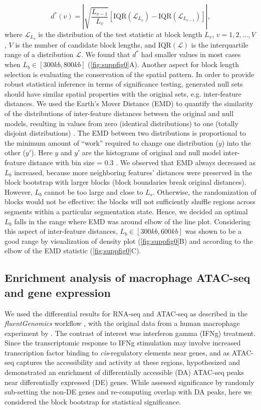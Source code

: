 \documentclass{article}
\begin{document}
$$ d^*(v)= \left| \sqrt{\frac{L_{v-1}}{L_v}} [\text{IQR}(\mathcal{L}_{L_v})-\text{IQR}(\mathcal{L}_{L_{v-1}})] \right|,$$
where $\mathcal{L}_{L_v}$ is the distribution of the test statistic at
block length $L_v$, $v = 1,2,\dots,V$, $V$ is the number of candidate
block lengths, and $\text{IQR}(\mathcal{L})$ is the interquartile
range of a distribution $\mathcal{L}$.
We found that $d^*$ had
smaller values in most cases when $L_b \in [300kb,800kb]$
(\cref{fig:suppfig0}A).
Another aspect for block length selection is evaluating the
conservation of the spatial pattern. In order to provide robust
statistical inference in terms of significance testing,
generated  null sets should have similar spatial properties with
the original sets, e.g. inter-feature distances.
We used the Earth's Mover
Distance (EMD) to quantify the similarity of the distributions of
inter-feature distances between the original and 
null models, resulting 
in values from zero (identical distributions) to one (totally disjoint
distributions) \citep{emd}.
The EMD between two distributions is proportional to
the minimum amount of ``work'' required to change one distribution ($y$)
into the other ($y'$). Here $y$ and $y'$ are the histograms of
original and 
null model inter-feature distance with bin size = 0.3 .
We observed that EMD always decreased as $L_b$ increased, because more
neighboring  features' distances were preserved in the
block bootstrap with larger blocks (block boundaries break original
distances).
However, $L_b$ cannot be too large and close to $L_s$.
Otherwise, the randomization of blocks would not
be effective: the blocks will not sufficiently shuffle regions across
segments within a particular segmentation state.
Hence, we decided an optimal $L_b$ falls in the range where EMD
was around elbow of the line plot. Considering this aspect of
inter-feature distances, $L_b \in [300kb,600kb]$ was
shown to be a good range by visualization of density plot
(\cref{fig:suppfig0}B) and according to the elbow of the EMD statistic
(\cref{fig:suppfig0}C).

\subsection{Enrichment analysis of macrophage ATAC-seq and gene expression}\label{sec:splines}

We used the differential results for RNA-seq and ATAC-seq as
described in the \textit{fluentGenomics} workflow \citep{lee2020fluent}, with
the original data from a human macrophage experiment by \citet{alasoo2018shared}.
The contrast of interest was interferon gamma (IFNg) treatment. Since the
transcriptomic response to IFNg stimulation may involve increased
transcription factor binding to \textit{cis}-regulatory elements near
genes, and as ATAC-seq captures the accessibility and activity at
these regions, \citet{lee2020fluent} hypothesized and demonstrated an
enrichment of differentially accessible (DA) ATAC-seq peaks near
differentially expressed (DE) genes. While \citet{lee2020fluent}
assessed significance by randomly sub-setting the non-DE genes and
re-computing overlap with DA peaks, here we considered the block
bootstrap for statistical significance.
\end{document}
